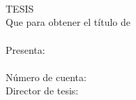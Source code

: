\begin{titlepage}
\begin{center}
{\Large\MakeUppercase{\universidad}}\\[0.5cm]
{\large\MakeUppercase{\facultad}}\\[2cm]
{\Large\bfseries\MakeUppercase{\titulotesis}}\\[2cm]
{\large TESIS}\\[0.5cm]
Que para obtener el título de\\[0.5cm]
{\bfseries\MakeUppercase{\grado}}\\[1.5cm]
Presenta:\\[0.5cm]
{\large\bfseries\autor}\\[0.25cm]
Número de cuenta: \numerocuenta\\[1.5cm]
Director de tesis:\\[0.5cm]
{\bfseries\asesor}
\vfill
\lugar\\[0.3cm]
\anio
\end{center}
\end{titlepage}
